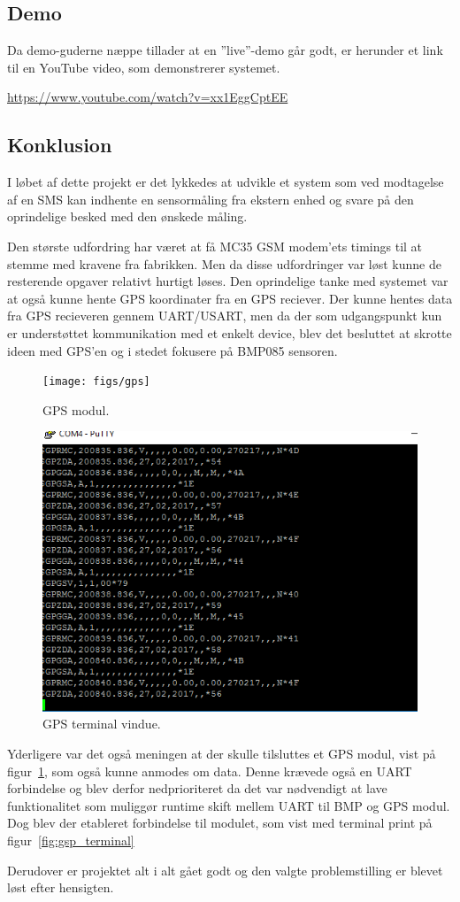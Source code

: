 \subsection{Demo}
Da demo-guderne næppe tillader at en ''live''-demo går godt, er herunder et link til en YouTube video, som demonstrerer systemet.

\vskip 0.5cm
	\begin{center}
		\url{https://www.youtube.com/watch?v=xx1EggCptEE}
	\end{center}
\vskip 0.5cm

\subsection{Konklusion}

I løbet af dette projekt er det lykkedes at udvikle et system som ved modtagelse af en SMS kan indhente en sensormåling fra ekstern enhed og svare på den oprindelige besked med den ønskede måling. 

Den største udfordring har været at få MC35 GSM modem'ets timings til at stemme med kravene fra fabrikken. Men da disse udfordringer var løst kunne de resterende opgaver relativt hurtigt løses.
Den oprindelige tanke med systemet var at også kunne hente GPS koordinater fra en GPS reciever. Der kunne hentes data fra GPS recieveren gennem UART/USART, men da der som udgangspunkt kun 
er understøttet kommunikation med et enkelt device, blev det besluttet at skrotte ideen med GPS'en og i stedet fokusere på BMP085 sensoren.

\begin{figure}
	\centering
	\texttt{[image: figs/gps]}
	\caption{GPS modul.}
	\label{fig:gps}
\end{figure}


\begin{figure}
	\centering
	\includegraphics[width=0.7\linewidth]{figs/gps_terminal}
	\caption{GPS terminal vindue.}
	\label{fig:gps_terminal}
\end{figure}

Yderligere var det også meningen at der skulle tilsluttes et GPS modul, vist på figur~\ref{fig:gps}, som også kunne anmodes om data. Denne krævede også en UART forbindelse og blev derfor nedprioriteret da det var nødvendigt at lave funktionalitet som muliggør runtime skift mellem UART til BMP og GPS modul. Dog blev der etableret forbindelse til modulet, som vist med terminal print på figur~\ref{fig:gsp_terminal}

Derudover er projektet alt i alt gået godt og den valgte problemstilling er blevet løst efter hensigten. 
